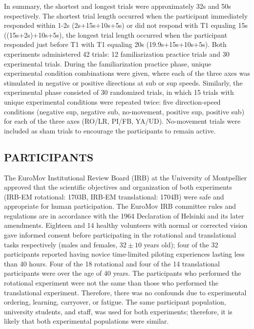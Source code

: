 \documentclass{ieeeaccess}
\begin{document}
\indent In summary, the shortest and longest trials were approximately 32s and 50s respectively. The shortest trial length occurred when the participant immediately responded within 1-2s (2s+15s+10s+5s) or did not respond with T1 equaling 15s ((15s+2s)+10s+5s), the longest trial length occurred when the participant responded just before T1 with T1 equaling 20s (19.9s+15s+10s+5s). Both experiments administered 42 trials: 12 familiarization practice trials and 30 experimental trials. During the familiarization practice phase, unique experimental condition combinations were given, where each of the three axes was stimulated in negative or positive directions at sub or sup speeds. Similarly, the experimental phase consisted of 30 randomized trials, in which 15 trials with unique experimental conditions were repeated twice: five direction-speed conditions (negative sup, negative sub, no-movement, positive sup, positive sub) for each of the three axes (RO/LR, PI/FB, YA/UD). No-movement trials were included as sham trials to encourage the participants to remain active.

\subsection{PARTICIPANTS}
The EuroMov Institutional Review Board (IRB) at the University of Montpellier approved that the scientific objectives and organization of both experiments (IRB-EM rotational: 1703B, IRB-EM translational: 1704B) were safe and appropriate for human participation. The EuroMov IRB committee rules and regulations are in accordance with the 1964 Declaration of Helsinki and its later amendments. Eighteen and 14 healthy volunteers with normal or corrected vision gave informed consent before participating in the rotational and translational tasks respectively (males and females, $32\pm10$ years old); four of the 32 participants reported having novice time-limited piloting experiences lasting less than 40 hours. Four of the 18 rotational and four of the 14 translational participants were over the age of 40 years. The participants who performed the rotational experiment were not the same than those who performed the translational experiment. Therefore, there was no confounds due to experimental ordering, learning, carryover, or fatigue. The same participant population, university students, and staff, was used for both experiments; therefore, it is likely that both experimental populations were similar.
\end{document}
